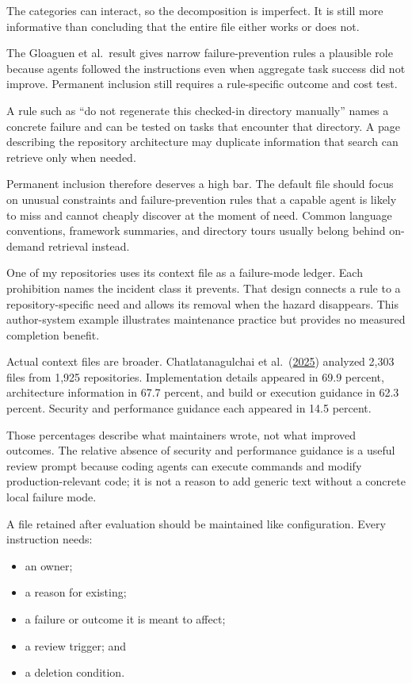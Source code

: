 The categories can interact, so the decomposition is imperfect. It is still more informative than concluding that the entire file either works or does not.

The Gloaguen et al.~result gives narrow failure-prevention rules a plausible role because agents followed the instructions even when aggregate task success did not improve. Permanent inclusion still requires a rule-specific outcome and cost test.

A rule such as ``do not regenerate this checked-in directory manually'' names a concrete failure and can be tested on tasks that encounter that directory. A page describing the repository architecture may duplicate information that search can retrieve only when needed.

Permanent inclusion therefore deserves a high bar. The default file should focus on unusual constraints and failure-prevention rules that a capable agent is likely to miss and cannot cheaply discover at the moment of need. Common language conventions, framework summaries, and directory tours usually belong behind on-demand retrieval instead.

One of my repositories uses its context file as a failure-mode ledger. Each prohibition names the incident class it prevents. That design connects a rule to a repository-specific need and allows its removal when the hazard disappears. This author-system example illustrates maintenance practice but provides no measured completion benefit.

Actual context files are broader. Chatlatanagulchai et al.~(\href{https://arxiv.org/abs/2511.12884}{2025}) analyzed 2,303 files from 1,925 repositories. Implementation details appeared in 69.9 percent, architecture information in 67.7 percent, and build or execution guidance in 62.3 percent. Security and performance guidance each appeared in 14.5 percent.

Those percentages describe what maintainers wrote, not what improved outcomes. The relative absence of security and performance guidance is a useful review prompt because coding agents can execute commands and modify production-relevant code; it is not a reason to add generic text without a concrete local failure mode.


A file retained after evaluation should be maintained like configuration. Every instruction needs:

\begin{itemize}
\tightlist
\item
  an owner;
\item
  a reason for existing;
\item
  a failure or outcome it is meant to affect;
\item
  a review trigger; and
\item
  a deletion condition.
\end{itemize}

